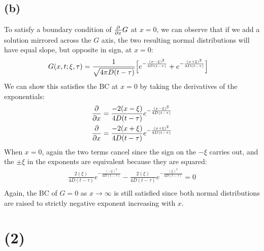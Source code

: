 \documentclass{article}
\begin{document}
\subsection*{\textbf{(b)}}
To satisfy a boundary condition of $\pdv{}{x}G$ at $x=0$, we can observe that if we add a solution mirrored across the $G$ axis, the two resulting normal distributions will have equal slope, but opposite in sign, at $x=0$:
\begin{equation}
\begin{aligned}
G(x, t;\xi, \tau) &= \frac{1}{\sqrt{4\pi D(t-\tau)}}\Big{[} e^{-\frac{(x-\xi)^2}{4D(t-\tau)}}+e^{-\frac{(x+\xi)^2}{4D(t-\tau)}}\Big{]}
\end{aligned}
\end{equation}
We can show this satisfies the BC at $x=0$ by taking the derivatives of the exponentials:
\begin{equation}
\begin{aligned}
\pdv{}{x}(e^{-\frac{(x-\xi)^2}{4 D(t-\tau)}}) = \frac{-2(x-\xi)}{4D(t-\tau)}e^{-\frac{(x-\xi)^2}{4D(t-\tau)}}\\
\pdv{}{x}(e^{-\frac{(x+\xi)^2}{4D(t-\tau)}}) = \frac{-2(x+\xi)}{4D(t-\tau)}e^{-\frac{(x+\xi)^2}{4D(t-\tau)}}\\
\end{aligned}
\end{equation}
When $x=0$, again the two terms cancel since the sign on the $-\xi$ carries out, and the $\pm\xi$ in the exponents are equivalent because they are squared:
\begin{equation}
\begin{aligned}
 \frac{2(\xi)}{4D(t-\tau)}e^{-\frac{(-\xi)^2}{4D(t-\tau)}} - \frac{2(\xi)}{4D(t-\tau)}e^{-\frac{(\xi)^2}{4D(t-\tau)}}=0\\
\end{aligned}
\end{equation}
Again, the BC of $G=0$ as $x\to\infty$ is still satisfied since both normal distributions are raised to strictly negative exponent increasing with $x$.
\section*{\textbf{(2)}}
\end{document}
